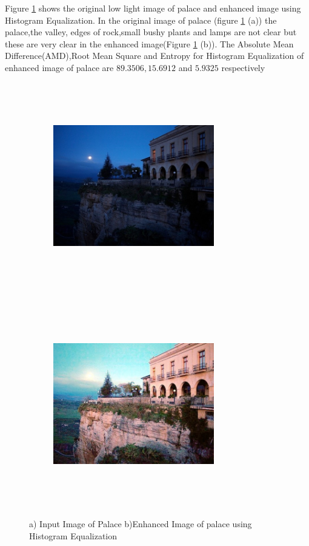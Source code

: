 Figure \ref{fig:palaceHistEq} shows the original low light image of palace and enhanced image using Histogram Equalization. In the original image of palace (figure \ref{fig:palaceHistEq} (a))  the palace,the valley, edges of rock,small bushy plants and lamps are not clear but these are very clear in the enhanced image(Figure \ref{fig:palaceHistEq} (b)). The Absolute Mean Difference(AMD),Root Mean Square and Entropy for Histogram Equalization of enhanced image of palace are $89.3506, 15.6912$ and $5.9325$ respectively      


\begin{figure}[!htb]
	\begin{subfigure}{8cm}
		\centering    
    	\includegraphics[width=7cm,height=9cm,keepaspectratio]{images/ch5/palace_input.jpg}
    	\caption{} 
    \end{subfigure}
  	\begin{subfigure}{6cm}
  		\centering
  		\includegraphics[width=7cm,height=9cm,keepaspectratio]{images/ch5/palace_hist_equ.jpg}
   		\caption{}
  	\end{subfigure}
  	\caption{a) Input Image of Palace b)Enhanced Image of palace using Histogram Equalization}
  	\label{fig:palaceHistEq}
\end{figure}

